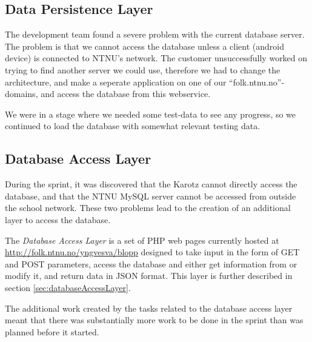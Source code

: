\subsection{Data Persistence Layer}
The development team found a severe problem with the current database server.
The problem is that we cannot access the database unless a client (android
device) is connected to NTNU's network. The customer unsuccessfully worked on trying to find another server we could use, therefore we had to change the
architecture, and make a seperate application on one of our
``folk.ntnu.no''-domains, and access the database from this webservice. 

We were in a stage where we needed some test-data to see any progress, so we
continued to load the database with somewhat relevant testing data.

\subsection{Database Access Layer}
During the sprint, it was discovered that the Karotz cannot directly access the database, and that the
NTNU MySQL server cannot be accessed from outside the school network. These two problems lead to the
creation of an additional layer to access the database.

The \emph{Database Access Layer} is a set of PHP web pages currently hosted at \url{http://folk.ntnu.no/yngvesva/blopp}
designed to take input in the form of GET and POST parameters, access the database and either get
information from or modify it, and return data in JSON format. This layer is further described
in section \ref{sec:databaseAccessLayer}.

The additional work created by the tasks related to the database access layer meant that there was
substantially more work to be done in the sprint than was planned before it started.

